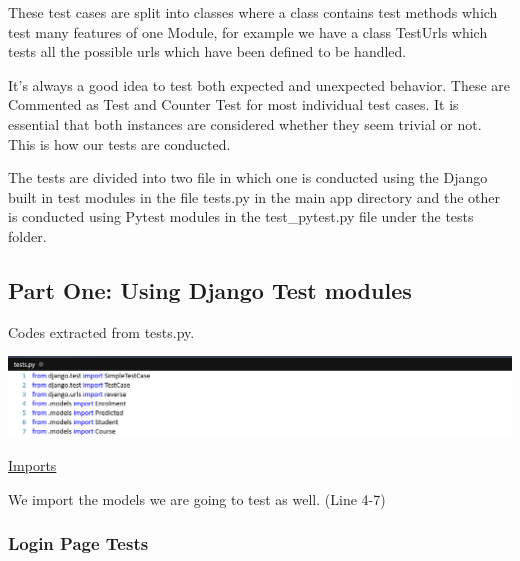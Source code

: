 \documentclass[10pt]{article}
\begin{document}
These test cases are split into classes where a class contains test methods which test many features of one Module, for example we have a class TestUrls which tests all the possible urls which have been defined to be handled.

It’s always a good idea to test both expected and unexpected behavior. These are Commented as Test and Counter Test for most individual test cases. It is essential that both instances are considered whether they seem trivial or not. This is how our tests are conducted.

The tests are divided into two file in which one is conducted using the Django built in test modules in the file tests.py  in the main app directory and the other is conducted using Pytest modules in the test\_pytest.py file under the tests folder.

\subsection{Part One:  Using Django Test modules}

Codes extracted from tests.py.

\begin{center}
\includegraphics[width=.9\textwidth]{imports.png}
\end{center}
\caption{\underline{Imports}}
We import the models we are going to test as well. (Line 4-7)

\subsubsection{Login Page Tests}
\end{document}
